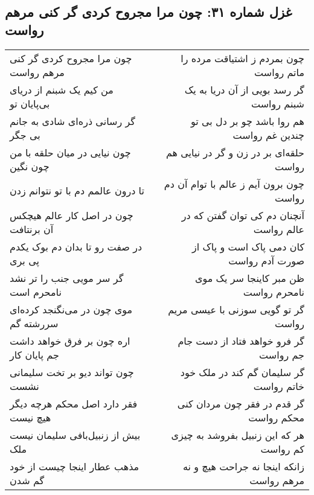 \begin{center}
\section*{غزل شماره ۳۱: چون مرا مجروح کردی گر کنی مرهم رواست}
\label{sec:031}
\begin{longtable}{l p{0.5cm} r}
چون مرا مجروح کردی گر کنی مرهم رواست
&&
چون بمردم ز اشتیاقت مرده را ماتم رواست
\\
من کیم یک شبنم از دریای بی‌پایان تو
&&
گر رسد بویی از آن دریا به یک شبنم رواست
\\
گر رسانی ذره‌ای شادی به جانم بی جگر
&&
هم روا باشد چو بر دل بی تو چندین غم رواست
\\
چون نیایی در میان حلقه با من چون نگین
&&
حلقه‌ای بر در زن و گر در نیایی هم رواست
\\
تا درون عالمم دم با تو نتوانم زدن
&&
چون برون آیم ز عالم با توام آن دم رواست
\\
چون در اصل کار عالم هیچکس آن برنتافت
&&
آنچنان دم کی توان گفتن که در عالم رواست
\\
در صفت رو تا بدان دم بوک یکدم پی بری
&&
کان دمی پاک است و پاک از صورت آدم رواست
\\
گر سر مویی جنب را تر نشد نامحرم است
&&
ظن مبر کاینجا سر یک موی نامحرم رواست
\\
موی چون در می‌نگنجد کرده‌ای سررشته گم
&&
گر تو گویی سوزنی با عیسی مریم رواست
\\
اره چون بر فرق خواهد داشت جم پایان کار
&&
گر فرو خواهد فتاد از دست جام جم رواست
\\
چون تواند دیو بر تخت سلیمانی نشست
&&
گر سلیمان گم کند در ملک خود خاتم رواست
\\
فقر دارد اصل محکم هرچه دیگر هیچ نیست
&&
گر قدم در فقر چون مردان کنی محکم رواست
\\
بیش از زنبیل‌بافی سلیمان نیست ملک
&&
هر که این زنبیل بفروشد به چیزی کم رواست
\\
مذهب عطار اینجا چیست از خود گم شدن
&&
زانکه اینجا نه جراحت هیچ و نه مرهم رواست
\\
\end{longtable}
\end{center}
